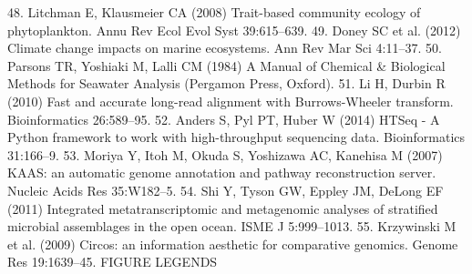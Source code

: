 48. 	Litchman E, Klausmeier CA (2008) Trait-based community ecology of phytoplankton. Annu Rev Ecol Evol Syst 39:615–639.
49. 	Doney SC et al. (2012) Climate change impacts on marine ecosystems. Ann Rev Mar Sci 4:11–37.
50. 	Parsons TR, Yoshiaki M, Lalli CM (1984) A Manual of Chemical & Biological Methods for Seawater Analysis (Pergamon Press, Oxford).
51. 	Li H, Durbin R (2010) Fast and accurate long-read alignment with Burrows-Wheeler transform. Bioinformatics 26:589–95.
52. 	Anders S, Pyl PT, Huber W (2014) HTSeq - A Python framework to work with high-throughput sequencing data. Bioinformatics 31:166–9.
53. 	Moriya Y, Itoh M, Okuda S, Yoshizawa AC, Kanehisa M (2007) KAAS: an automatic genome annotation and pathway reconstruction server. Nucleic Acids Res 35:W182–5.
54. 	Shi Y, Tyson GW, Eppley JM, DeLong EF (2011) Integrated metatranscriptomic and metagenomic analyses of stratified microbial assemblages in the open ocean. ISME J 5:999–1013.
55. 	Krzywinski M et al. (2009) Circos: an information aesthetic for comparative genomics. Genome Res 19:1639–45. 
FIGURE LEGENDS


